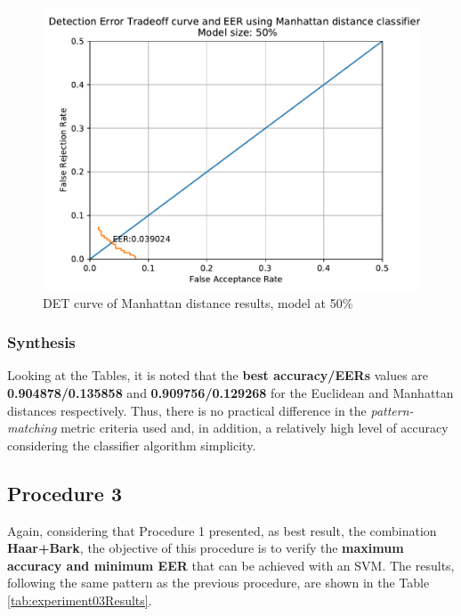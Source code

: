 			\begin{figure}[H]
				\centering
				\includegraphics[scale=.6]{images/results/det/DET_for_classifier_Manhattan_50}
				\caption{DET curve of Manhattan distance results, model at 50\%}
				\label{fig:detforclassifiermanhattan50}
			\end{figure}
		
			
		
		\subsubsection{Synthesis}
			\par Looking at the Tables, it is noted that the \textbf{best accuracy/EERs} values are \textbf{0.904878/0.135858} and \textbf{0.909756/0.129268} for the Euclidean and Manhattan distances respectively. Thus, there is no practical difference in the \textit{pattern-matching} metric criteria used and, in addition, a relatively high level of accuracy considering the classifier algorithm simplicity.
		
	\subsection{Procedure 3}
		\label{sec:testsResults:subsec:Experimento03}
		
		\par Again, considering that Procedure 1 presented, as best result, the combination \textbf{Haar+Bark}, the objective of this procedure is to verify the \textbf{maximum accuracy and minimum EER} that can be achieved with an SVM. The results, following the same pattern as the previous procedure, are shown in the Table \ref{tab:experiment03Results}.
				
